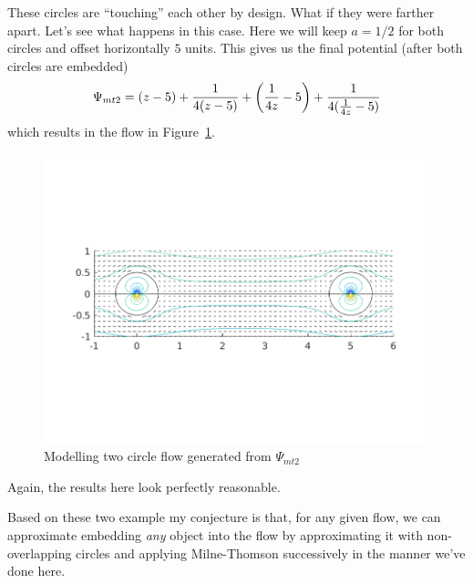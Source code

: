 \documentclass{article}
\begin{document}
These circles are ``touching'' each other by design. What if they were
farther apart. Let's see what happens in this case. Here we will keep $a
= 1/2$ for both circles and offset horizontally $5$ units. This gives us
the final potential (after both circles are embedded)
%
\begin{equation*}
    \Psi_{mt2}
        = (z - 5) + \frac{1}{4 (z - 5)}
        + \del{\frac{1}{4z} - 5} + \frac{1}{4 (\frac{1}{4z} - 5)}
\end{equation*}
%
which results in the flow in Figure~\ref{fig:mt-7}.
%
\begin{figure}[ht]
    \includegraphics[width=35em]{mt_ex3_2}
    \centering
    \caption{Modelling two circle flow generated from $\Psi_{mt2}$}
    \label{fig:mt-7}
\end{figure}
%
Again, the results here look perfectly reasonable.

Based on these two example my conjecture is that, for any given flow, we
can approximate embedding \textit{any} object into the flow by
approximating it with non-overlapping circles and applying Milne-Thomson
successively in the manner we've done here.
\end{document}
